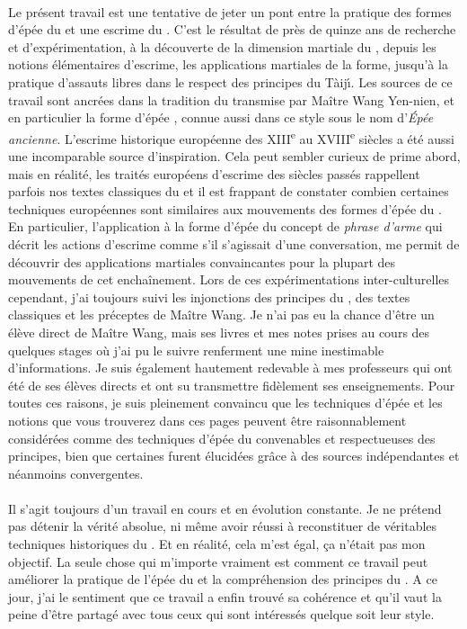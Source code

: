 \paragraph*{}
Le présent travail est une tentative de jeter un pont entre la pratique des formes d'épée du \Taiji{} et une escrime du \Taijijian{}.
C'est le résultat de près de quinze ans de recherche et d'expérimentation, à la découverte de la dimension martiale du \Taijijian{}, depuis les notions élémentaires d'escrime, les applications martiales de la forme, jusqu'à la pratique d'assauts libres dans le respect des principes du {T\`{a}ij\'{\i}}. 
Les sources de ce travail sont ancrées dans la tradition du \Yangjia{} \Michuan{} \Taijijian{} transmise par Maître Wang Yen-nien, et en particulier la forme d'épée \Kunlun{}, connue aussi dans ce style sous le nom d'\emph{Épée ancienne}.
L'escrime historique européenne des XIII\textsuperscript{e} au XVIII\textsuperscript{e} siècles a été aussi une incomparable source d'inspiration.
Cela peut sembler curieux de prime abord, mais en réalité, les traités européens d'escrime des siècles passés rappellent parfois nos textes classiques du \Taiji{} et il est frappant de constater combien certaines techniques européennes sont similaires aux mouvements des formes d'épée du \Taiji{}.
En particulier, l'application à la forme d'épée \Kunlun{} du concept de \emph{phrase d'arme} qui décrit les actions d'escrime comme s'il s'agissait d'une conversation, me permit de découvrir des applications martiales convaincantes pour la plupart des mouvements de cet enchaînement.
Lors de ces expérimentations inter-culturelles cependant, j'ai toujours suivi les injonctions des principes du \Taiji{}, des textes classiques et les préceptes de Maître Wang.
Je n'ai pas eu la chance d'être un élève direct de Maître Wang, mais ses livres et mes notes prises au cours des quelques stages où j'ai pu le suivre renferment une mine inestimable d'informations.
Je suis également hautement redevable à mes professeurs qui ont été de ses élèves directs et ont su transmettre fidèlement ses enseignements.
Pour toutes ces raisons, je suis pleinement convaincu que les techniques d'épée et les notions que vous trouverez dans ces pages peuvent être raisonnablement considérées comme des techniques d'épée du \Taiji{} convenables et respectueuses des principes, bien que certaines furent élucidées grâce à des sources indépendantes et néanmoins convergentes.

\paragraph*{}
Il s'agit toujours d'un travail en cours et en évolution constante.
Je ne prétend pas détenir la vérité absolue, ni même avoir réussi à reconstituer de véritables techniques historiques du \Taijijian{}.
Et en réalité, cela m'est égal, ça n'était pas mon objectif. 
La seule chose qui m'importe vraiment est comment ce travail peut améliorer la pratique de l'épée du \Taiji{} et la compréhension des principes du \Taiji{}. 
A ce jour, j'ai le sentiment que ce travail a enfin trouvé sa cohérence et qu'il vaut la peine d'être partagé avec tous ceux qui sont intéressés quelque soit leur style.

